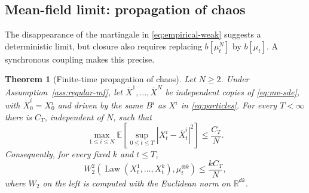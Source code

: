 \documentclass[11pt]{amsart}
\numberwithin{equation}{section}
\theoremstyle{plain}
\newtheorem{theorem}{Theorem}[section]
\newcommand{\R}{\mathbb{R}}
\newcommand{\E}{\mathbb{E}}
\newcommand{\abs}[1]{\left\lvert#1\right\rvert}
\DeclareMathOperator{\Law}{Law}
\begin{document}
\subsection{Mean-field limit: propagation of chaos}
The disappearance of the martingale in \eqref{eq:empirical-weak} suggests a
deterministic limit, but closure also requires replacing
$b[\mu_t^N]$ by $b[\mu_t]$.  A synchronous coupling makes this precise.

\begin{theorem}[Finite-time propagation of chaos]\label{thm:poc} Let $N\geq 2$. 
Under Assumption~\ref{ass:regular-mf}, let
$\overline X^1,\ldots,\overline X^N$ be independent copies of
\eqref{eq:mv-sde}, with $\overline X_0^i=X_0^i$ and driven by the same $B^i$ as
$X^i$ in \eqref{eq:particles}.   For every $T<\infty$ there is $C_T$, independent of $N$, such that
\begin{equation}\label{eq:poc-rate}
  \max_{1\leq i\leq N}
  \E\left[\sup_{0\leq t\leq T}
    \abs{X_t^i-\overline X_t^i}^2\right]\leq\frac{C_T}{N}.
\end{equation}
Consequently, for every fixed $k$ and $t\leq T$,
\begin{equation}\label{eq:k-chaos-rate}
 W_2^2\left(\Law(X_t^1,\ldots,X_t^k),\mu_t^{\otimes k}\right)
 \leq \frac{kC_T}{N},
\end{equation}
where $W_2$ on the left is computed with the Euclidean norm on $\R^{dk}$.
\end{theorem}
\end{document}
